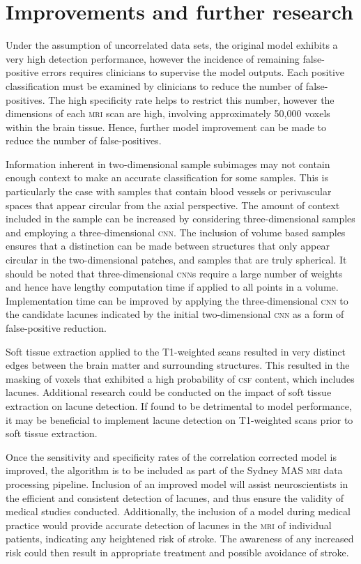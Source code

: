 \section{Improvements and further research}

Under the assumption of uncorrelated data sets, the original model exhibits a very high detection performance, however the incidence of remaining false-positive errors requires clinicians to supervise the model outputs. Each positive classification must be examined by clinicians to reduce the number of false-positives. The high specificity rate helps to restrict this number, however the dimensions of each \textsc{mri} scan are high, involving approximately 50,000 voxels within the brain tissue. Hence, further model improvement can be made to reduce the number of false-positives.

Information inherent in two-dimensional sample subimages may not contain enough context to make an accurate classification for some samples. This is particularly the case with samples that contain blood vessels or perivascular spaces that appear circular from the axial perspective. The amount of context included in the sample can be increased by considering three-dimensional samples and employing a three-dimensional \textsc{cnn}. The inclusion of volume based samples ensures that a distinction can be made between structures that only appear circular in the two-dimensional patches, and samples that are truly spherical. It should be noted that three-dimensional \textsc{cnn}s require a large number of weights and hence have lengthy computation time if applied to all points in a volume. Implementation time can be improved by applying the three-dimensional \textsc{cnn} to the candidate lacunes indicated by the initial two-dimensional \textsc{cnn} as a form of false-positive reduction.

Soft tissue extraction applied to the T1-weighted scans resulted in very distinct edges between the brain matter and surrounding structures. This resulted in the masking of voxels that exhibited a high probability of \textsc{csf} content, which includes lacunes. Additional research could be conducted on the impact of soft tissue extraction on lacune detection. If found to be detrimental to model performance, it may be beneficial to implement lacune detection on T1-weighted scans prior to soft tissue extraction.

Once the sensitivity and specificity rates of the correlation corrected model is improved, the algorithm is to be included as part of the Sydney MAS \textsc{mri} data processing pipeline. Inclusion of an improved model will assist neuroscientists in the efficient and consistent detection of lacunes, and thus ensure the validity of medical studies conducted. Additionally, the inclusion of a model during medical practice would provide accurate detection of lacunes in the \textsc{mri} of individual patients, indicating any heightened risk of stroke. The awareness of any increased risk could then result in appropriate treatment and possible avoidance of stroke.

